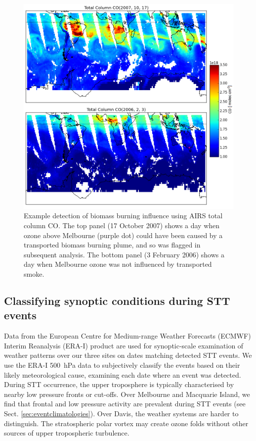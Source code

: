 \documentclass[acp, manuscript]{copernicus} %
\begin{document}
    \begin{figure}[t]
      \includegraphics[width=12cm]{figures/AIRS_compare.png}
      \caption{ %
	Example detection of biomass burning influence using AIRS total column CO. 
	The top panel (17 October 2007) shows a day when ozone above Melbourne (purple dot) could have been caused by a transported biomass burning plume, and so was flagged in subsequent analysis.
	The bottom panel (3 February 2006) shows a day when Melbourne ozone was not influenced by transported smoke.
	}
      \label{fig:excludedeg}
    \end{figure}

  \subsection{Classifying synoptic conditions during STT events}
  \label{Section:WeatherClassifications}
    Data from the European Centre for Medium-range Weather Forecasts (ECMWF) Interim Reanalysis (ERA-I) \citep{Dee2011} product are used for synoptic-scale examination of weather patterns over our three sites on dates matching detected STT events.
    We use the ERA-I 500~hPa data to subjectively classify the events based on their likely meteorological cause, examining each date where an event was detected.
    During STT occurrence, the upper troposphere is typically characterised by nearby low pressure fronts or cut-offs.
    Over Melbourne and Macquarie Island, we find that frontal and low pressure activity are prevalent during STT events (see Sect. \ref{sec:eventclimatologies}).
    Over Davis, the weather systems are harder to distinguish. The stratospheric polar vortex may create ozone folds without other sources of upper tropospheric turbulence.
\end{document}
